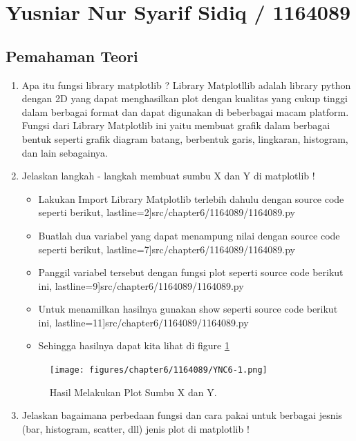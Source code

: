 \section{Yusniar Nur Syarif Sidiq / 1164089}
\subsection{Pemahaman Teori}

\begin{enumerate}

\item Apa itu fungsi library matplotlib ?
	\subitem Library Matplotllib adalah library python dengan 2D yang dapat menghasilkan plot dengan kualitas yang cukup tinggi dalam berbagai format dan dapat digunakan di beberbagai macam platform. Fungsi dari Library Matplotlib ini yaitu membuat grafik dalam berbagai bentuk seperti grafik diagram batang, berbentuk garis, lingkaran, histogram, dan lain sebagainya.

\item Jelaskan langkah - langkah membuat sumbu X dan Y di matplotlib !

	\begin{itemize}
		\item Lakukan Import Library Matplotlib terlebih dahulu dengan source code seperti berikut,
			 lastline=2]{src/chapter6/1164089/1164089.py}
		\item Buatlah dua variabel yang dapat menampung nilai dengan source code seperti berikut,
			 lastline=7]{src/chapter6/1164089/1164089.py}
		\item Panggil variabel tersebut dengan fungsi plot seperti source code berikut ini,
			 lastline=9]{src/chapter6/1164089/1164089.py}
		\item Untuk menamilkan hasilnya gunakan show seperti source code berikut ini,
			 lastline=11]{src/chapter6/1164089/1164089.py}
		\item Sehingga hasilnya dapat kita lihat di figure \ref{YNC6-1}
	\end{itemize}

	\begin{figure}[!htbp!]
		\centerline{\texttt{[image: figures/chapter6/1164089/YNC6-1.png]}}
		\caption{Hasil Melakukan Plot Sumbu X dan Y.}
		\label{YNC6-1}
	\end{figure}

\item Jelaskan bagaimana perbedaan fungsi dan cara pakai untuk berbagai jesnis (bar, histogram, scatter, dll) jenis plot di matplotlib !


\end{enumerate}

